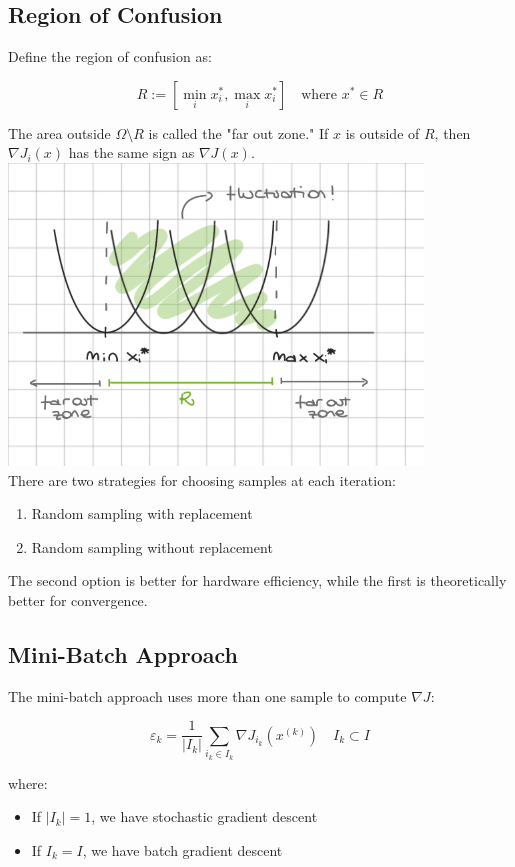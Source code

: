 \subsection*{Region of Confusion}

Define the region of confusion as:

\[R := [\min_i x_i^*, \max_i x_i^*] \quad \text{where } x^* \in R\]

The area outside $ \Omega \setminus R$ is called the "far out zone." If $x$ is outside of $R$, then $\nabla J_i(x)$ has the same sign as $\nabla J(x)$.
\includegraphics[]{namltexnotes/images/Screenshot 2024-06-26 110851.png}
\\There are two strategies for choosing samples at each iteration:

\begin{enumerate}
    \item Random sampling with replacement
    \item Random sampling without replacement
\end{enumerate}


The second option is better for hardware efficiency, while the first is theoretically better for convergence.

\subsection*{Mini-Batch Approach}

The mini-batch approach uses more than one sample to compute $\nabla J$:

\[\varepsilon_k = \frac{1}{|I_k|} \sum_{i_k \in I_k} \nabla J_{i_k}(x^{(k)}) \quad I_k \subset I\]

where:
\begin{itemize}
    \item If $|I_k| = 1$, we have stochastic gradient descent
    \item If $I_k = I$, we have batch gradient descent
\end{itemize}

